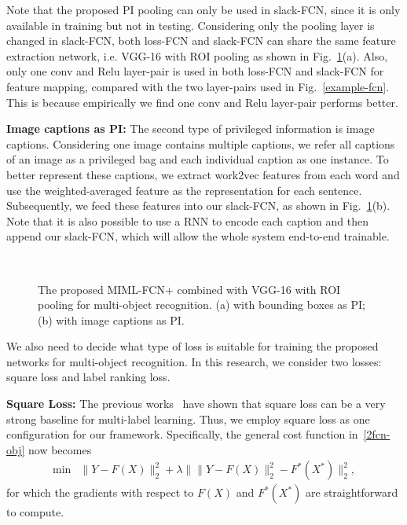 \documentclass[10pt,twocolumn,letterpaper]{article}
\begin{document}
Note that the proposed PI pooling can only be used in slack-FCN,
since it is only available in training but not in testing.
Considering only the pooling layer is changed in slack-FCN, both
loss-FCN and slack-FCN can share the same feature extraction
network, i.e. VGG-16 with ROI pooling as shown in
Fig.~\ref{pi}(a). Also, only one conv and Relu layer-pair is used
in both loss-FCN and slack-FCN for feature mapping, compared with
the two layer-pairs used in Fig.~\ref{example-fcn}. This is
because empirically we find one conv and Relu layer-pair performs
better.


\textbf{Image captions as PI:} The second type of privileged
information is image captions. Considering one image contains
multiple captions, we refer all captions of an image as a
privileged bag and each individual caption as one instance. To
better represent these captions, we extract work2vec features from
each word and use the weighted-averaged feature as the
representation for each sentence. Subsequently, we feed these
features into our slack-FCN, as shown in Fig.~\ref{pi}(b). Note
that it is also possible to use a RNN to encode each caption and
then append our slack-FCN, which will allow the whole system
end-to-end trainable.

\begin{figure}
	\centering
	\\
	\caption{The proposed \textsc{MIML-FCN+} combined with VGG-16 with ROI pooling for multi-object recognition. (a) with bounding boxes as PI; (b) with image captions as PI.}
	\label{pi}
\end{figure}

We also need to decide what type of loss is suitable for training
the proposed networks for multi-object recognition. In this
research, we consider two losses: square loss and label ranking
loss.

\textbf{Square Loss:} The previous works~\cite{Wei2014,Yang2016a}
have shown that square loss can be a very strong baseline for
multi-label learning. Thus, we employ square loss as one
configuration for our framework. Specifically, the general cost
function in~\eqref{2fcn-obj} now becomes
\begin{equation}
\label{square}
\begin{matrix}
\min & \|Y -F(X)\|_2^2 + \lambda\|\|Y -F(X)\|_2^2 -
F^*(X^*)\|_2^2,
\end{matrix}
\end{equation}
for which the gradients with respect to $F(X)$ and $F^*(X^*)$ are
straightforward to compute.
\end{document}
